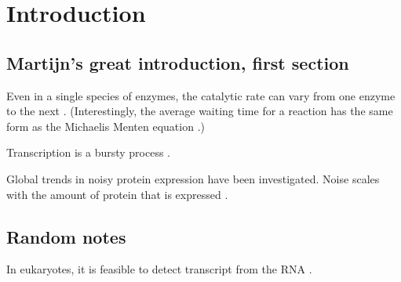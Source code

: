 \chapter{Introduction}
\label{chapter1:introduction}





\section{Martijn's great introduction, first section}


Even in a single species of enzymes, the catalytic rate can vary from one enzyme to the next \cite{Lu1998}. (Interestingly, the average waiting time for a reaction has the same form as the Michaelis Menten equation \cite{Xie2013}.)

Transcription is a bursty process \cite{Golding2005}. 

Global trends in noisy protein expression have been investigated. 
Noise scales with the amount of protein that is expressed \cite{Bar-Even2006}.

\section{Random notes}

In eukaryotes, it is feasible to detect transcript from the RNA \cite{Levsky2002}.


\FloatBarrier



